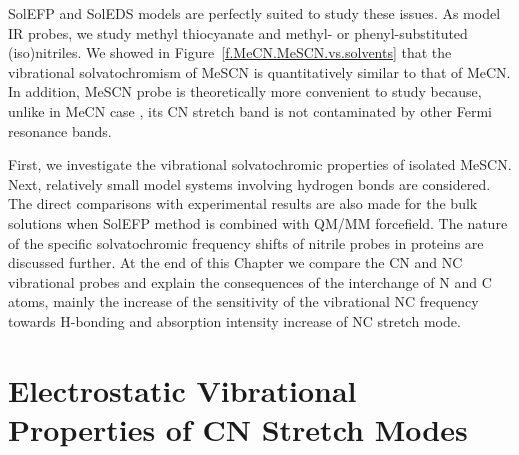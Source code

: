 \documentclass[a4paper,titlepage,twoside,fleqn,12pt]{book}
\begin{document}
\begin{refsection}
SolEFP and SolEDS models are
perfectly suited to study these issues. As model 
IR probes, we study methyl thiocyanate and methyl\hyp{} 
or phenyl\hyp{}substituted (iso)nitriles.
We showed in Figure~\ref{f.MeCN.MeSCN.vs.solvents} 
that the vibrational solvatochromism of MeSCN is
quantitatively similar to that of MeCN. In addition, 
MeSCN probe is theoretically more convenient to study
because, unlike in MeCN case \citep{Suzuki.Nakagawa.Fujiyama.SCActaA.1977}, 
its CN stretch band is not
contaminated by other Fermi resonance bands.

First, we investigate
the vibrational solvatochromic properties of isolated
MeSCN. Next, relatively small model systems
involving hydrogen bonds are considered. The direct
comparisons with experimental results are also made for the bulk
solutions when SolEFP method is combined with QM/MM forcefield. 
The nature of the specific
solvatochromic frequency shifts of nitrile probes in proteins
are discussed further. At the end of this Chapter we compare
the CN and NC vibrational probes and explain the consequences of the 
interchange of N and C atoms, mainly the increase of the sensitivity
of the vibrational NC frequency
towards H-bonding and absorption intensity increase of NC stretch mode.

\section{Electrostatic Vibrational Properties of CN Stretch Modes}


\end{refsection}
\end{document}
